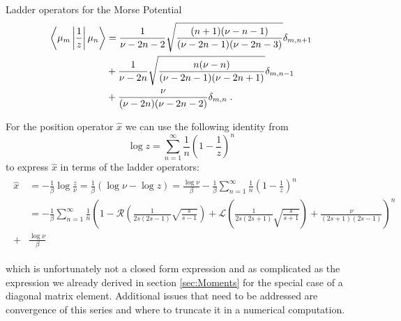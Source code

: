 \begin{chapter}{Ladder operators for the Morse Potential}
\begin{align}
    \begin{split}
	\left\langle \mu_m\left|\frac{1}{z}\right|\mu_n \right\rangle &= \frac{1}{\nu-2n-2}\sqrt{\frac{(n+1)(\nu-n-1)}{(\nu-2n-1)(\nu-2n-3)}}\delta_{m,n+1}\\
	&+\frac{1}{\nu-2n}\sqrt{\frac{n(\nu-n)}{(\nu-2n-1)(\nu-2n+1)}}\delta_{m,n-1}\\
	&+\frac{\nu}{(\nu-2n)(\nu-2n-2)}\delta_{m,n}\;.
    \end{split}
\end{align}

For the position operator $\hat{x}$ we can use the following identity from \cite{DongFactMethods}
\begin{equation}
    \log z=\sum_{n=1}^\infty\frac{1}{n}\left(1-\frac{1}{z}\right)^n
\end{equation}
to express $\hat{x}$ in terms of the ladder operators:
\begin{align}
    \begin{split}
    \hat{x}&=-\frac{1}{\beta}\log\frac{z}{\nu}=\frac{1}{\beta}\left(\log\nu - \log z\right) 
    	=\frac{\log\nu}{\beta}
    		-\frac{1}{\beta}\sum_{n=1}^\infty\frac{1}{n}\left( 1-\frac{1}{z}\right)^n \\
	    &= -\frac{1}{\beta}\sum_{n=1}^\infty\frac{1}{n}\left( 1-
	    \mathcal{R}\left(\frac{1}{2s(2s-1)}\sqrt{\frac{s}{s-1}}\right)+\mathcal{L}\left(\frac{1}{2s(2s+1)}\sqrt{\frac{s}{s+1}}\right)
    +\frac{\nu}{(2s+1)(2s-1)}
	     \right)^n\\
	     +& \frac{\log\nu}{\beta}
    \end{split}
\end{align}

which is unfortunately not a closed form expression and as complicated as the expression we already derived in section \ref{sec:Moments} for the special case of a diagonal matrix element. Additional issues that need to be addressed are convergence of this series and where to truncate it in a
numerical computation.



\end{chapter}
